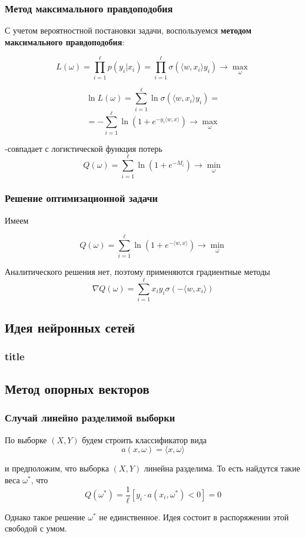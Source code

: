 \documentclass{beamer}
\begin{document}
	\begin{frame}
		\frametitle{Метод максимального правдоподобия}
		С учетом вероятностной постановки задачи, воспользуемся \textbf{методом максимального правдоподобия}:
		
		\[
		L(\omega) = \prod_{i=1}^{\ell} p(y_i | x_i) = 
		\prod_{i=1}^{\ell} \sigma(\langle w, x_i \rangle y_i)
		\rightarrow \max_{\omega}
		\]
		
		\[
		\ln L(\omega) 
		= \sum_{i=1}^{\ell} \ln \sigma(\langle w, x_i \rangle y_i)
		=
		\]
		\[
		= 
		- \sum_{i=1}^{\ell} \ln(1 + e^{-y_i \langle w, x \rangle}) \rightarrow \max_{\omega}
		\]
		
		-совпадает с логистической функция потерь 
		\[
		Q(\omega) = \sum_{i=1}^{\ell} \ln (1 + e^{-M_i}) \rightarrow \min_{\omega}
		\]
	\end{frame}
	
	\begin{frame}
		\frametitle{Решение оптимизационной задачи}
		Имеем
		
		\[
		Q(\omega) = \sum_{i=1}^{\ell} \ln (1 + e^{-\langle w, x \rangle}) \rightarrow \min_{\omega}
		\]
		
		Аналитического решения нет, поэтому применяются градиентные методы
		\[
		\nabla Q(\omega) = \sum_{i=1}^{\ell} x_i y_i \sigma(- \langle w, x_i \rangle)
		\]
	\end{frame}
	
	\subsection{Идея нейронных сетей}
	
	\begin{frame}
		\frametitle{title}
	\end{frame}
	
	\subsection{Метод опорных векторов}
	
	\begin{frame}
		\frametitle{Случай линейно разделимой выборки}
		
		По выборке $(X, Y)$ будем строить классификатор вида
		\[
		a(x, \omega) = \langle x, \omega \rangle
		\]
		
		и предположим, что выборка $(X, Y)$ линейна разделима. То есть найдутся такие веса $\omega^{*}$, что 
		\[
		Q(\omega^{*}) = \frac{1}{\ell} [y_i \cdot a(x_i, \omega^{*}) < 0] = 0
		\]
		
		Однако такое решение $\omega^{*}$ не единственное. Идея состоит в распоряжении этой свободой с умом.
	\end{frame}
	
\end{document}
